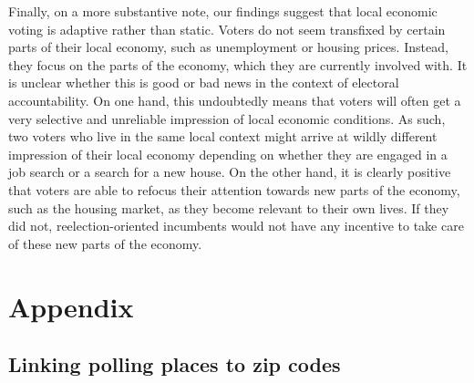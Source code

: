\documentclass[12pt,a4paper]{article}
\begin{document}
	Finally, on a more substantive note, our findings suggest that local economic voting is adaptive rather than static. Voters do not seem transfixed by certain parts of their local economy, such as unemployment or housing prices. Instead, they focus on the parts of the economy, which they are currently involved with. It is unclear whether this is good or bad news in the context of electoral accountability. On one hand, this undoubtedly means that voters will often get a very selective and unreliable impression of  local economic conditions. As such, two voters who live in the same local context might arrive at wildly different impression of their local economy depending on whether they are engaged in a job search or a search for a new house.  On the other hand,  it is clearly positive that voters are able to refocus their attention towards new parts of the economy, such as the housing market, as they become relevant to their own lives. If they did not, reelection-oriented incumbents would not have any incentive to take care of these new parts of the economy.
	

	
	\clearpage
	
	\singlespacing
	
	
	
	
	\newpage
	
	\appendix
	\section*{Appendix}
		\onehalfspacing
	\renewcommand{\thesubsection}{\Alph{subsection}}
	\renewcommand{\thetable}{\Alph{subsection}\arabic{table}}
	\renewcommand{\thefigure}{\Alph{subsection}\arabic{figure}}
	

	
	\newpage
	
	\subsection{Linking polling places to zip codes}\label{app_linking}
	
\end{document}
